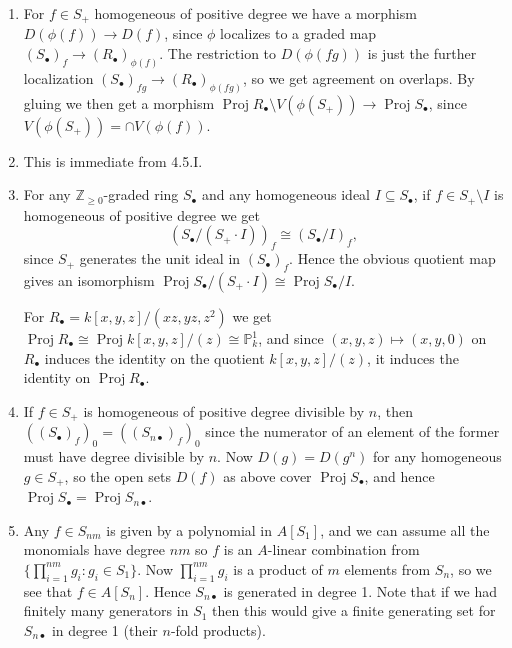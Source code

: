 \documentclass{report}
\renewcommand{\P}{\mathbb{P}} %
\newcommand{\Z}{\mathbb{Z}}
\DeclareMathOperator{\Proj}{Proj}
\begin{document}
\begin{enumerate}[label=\textbf{6.4.\Alph*.}]
	\item For $f\in S_+$ homogeneous of positive degree we have a morphism
	      $D(\phi(f))\to D(f)$, since $\phi$ localizes to a graded map
	      $(S_\bullet)_f\to(R_\bullet)_{\phi(f)}$. The restriction to
	      $D(\phi(fg))$ is just the further localization
	      $(S_\bullet)_{fg}\to(R_\bullet)_{\phi(fg)}$, so we get agreement on
	      overlaps. By gluing we then get a morphism
	      $\Proj R_\bullet\setminus V(\phi(S_+))\to\Proj S_\bullet$, since
	      $V(\phi(S_+))=\cap V(\phi(f))$.

	\item This is immediate from 4.5.I.

	\item For any $\Z_{\ge0}$-graded ring $S_\bullet$ and any homogeneous ideal
	      $I\subseteq S_\bullet$, if $f\in S_+\setminus I$ is homogeneous of
	      positive degree we get
	      \begin{equation*}
		      (S_\bullet/(S_+\cdot I))_f\cong(S_\bullet/I)_f,
	      \end{equation*}
	      since $S_+$ generates the unit ideal in $(S_\bullet)_f$. Hence the
	      obvious quotient map gives an isomorphism
	      $\Proj S_\bullet/(S_+\cdot I)\cong\Proj S_\bullet/I$.

	      For $R_\bullet=k[x,y,z]/(xz,yz,z^2)$ we get
	      $\Proj R_\bullet\cong\Proj k[x,y,z]/(z)\cong\P^1_k$, and since
	      $(x,y,z)\mapsto(x,y,0)$ on $R_\bullet$ induces the identity on the
	      quotient $k[x,y,z]/(z)$, it induces the identity on $\Proj R_\bullet$.

	\item If $f\in S_+$ is homogeneous of positive degree divisible by $n$, then
	      $((S_\bullet)_f)_0=((S_{n\bullet})_f)_0$ since the numerator of an
	      element of the former must have degree divisible by $n$. Now
	      $D(g)=D(g^n)$ for any homogeneous $g\in S_+$, so the open sets $D(f)$
	      as above cover $\Proj S_\bullet$, and hence
	      $\Proj S_\bullet=\Proj S_{n\bullet}$.

	\item Any $f\in S_{nm}$ is given by a polynomial in $A[S_1]$, and we can
	      assume all the monomials have degree $nm$ so $f$ is an $A$-linear
	      combination from $\{\prod_{i=1}^{nm}g_i:g_i\in S_1\}$. Now
	      $\prod_{i=1}^{nm}g_i$ is a product of $m$ elements from $S_n$, so we see
	      that $f\in A[S_n]$. Hence $S_{n\bullet}$ is generated in degree 1. Note
	      that if we had finitely many generators in $S_1$ then this would give a
	      finite generating set for $S_{n\bullet}$ in degree 1 (their $n$-fold
	      products).


\end{enumerate}
\end{document}
